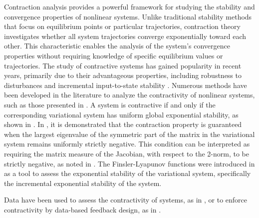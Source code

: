 \documentclass[journal,twoside,web]{ieeecolor}
\begin{document}
Contraction analysis \cite{lohmiller1998contraction} provides a powerful framework for studying the stability and convergence properties of nonlinear systems. Unlike traditional stability methods that focus on equilibrium points or particular trajectories, contraction theory investigates whether all system trajectories converge exponentially toward each other. This characteristic enables the analysis of the system's convergence properties without requiring knowledge of specific equilibrium values or trajectories.
The study of contractive systems has gained popularity in recent years, primarily due to their advantageous properties, including robustness to disturbances and incremental input-to-state stability \cite{angeli2002lyapunov}. Numerous methods have been developed in the literature to analyze the contractivity of nonlinear systems, such as those presented in \cite{aminzare2014contraction,barabanov2019contraction,forni2013differential,lohmiller1998contraction,hu2024enforcing,eising2023cautious,jouffroy2010tutorial}. A system is contractive if and only if the corresponding variational system has uniform global exponential stability, as shown in \cite{barabanov2019contraction,jouffroy2010tutorial}. In \cite{lohmiller1998contraction}, it is demonstrated that the contraction property is guaranteed when the largest eigenvalue of the symmetric part of the matrix in the variational system remains uniformly strictly negative. This condition can be interpreted as requiring the matrix measure of the Jacobian, with respect to the 2-norm, to be strictly negative, as noted in \cite{aminzare2014contraction}. The Finsler-Lyapunov functions were introduced in \cite{forni2013differential} as a tool to assess the exponential stability of the variational system, specifically the incremental exponential stability of the system. 

Data have been used to assess the contractivity of systems, as in \cite{eising2023cautious}, or to enforce contractivity by data-based feedback design, as in \cite{hu2024enforcing}.
\end{document}
